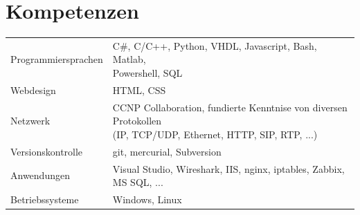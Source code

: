 	\section*{Kompetenzen}
	\begin{tabularx}{\textwidth}{b{4cm}|l}
		Programmiersprachen & \makecell[cl]{C\#, C/C++, Python, VHDL, Javascript, Bash, Matlab, \\ Powershell, SQL} \\
		Webdesign & HTML, CSS \\
		Netzwerk & \makecell[cl]{CCNP Collaboration, fundierte Kenntnise von diversen Protokollen \\ (IP, TCP/UDP, Ethernet, HTTP, SIP, RTP, ...)} \\
		Versionskontrolle & git, mercurial, Subversion \\
		Anwendungen & Visual Studio, Wireshark, IIS, nginx, iptables, Zabbix, MS SQL, ... \\
		Betriebssysteme & Windows, Linux
	\end{tabularx}
